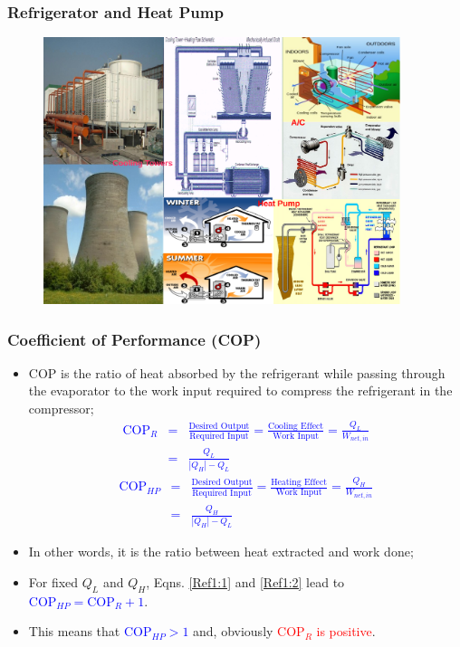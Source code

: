 \documentclass[10pt,compress,handout,ignorenonframetext]{beamer}
\newcommand{\frc}{\displaystyle\frac}
\begin{document}
\begin{frame}
 \frametitle{Refrigerator and Heat Pump}
    \begin{figure}%
     \begin{center}
      \includegraphics[width=12.cm,height=7.8cm]{./Pics/Overview_Refrig3}
     \end{center}
    \end{figure}
\end{frame}


\begin{frame}
 \frametitle{Coefficient of Performance (COP)}
 \begin{itemize}
  \item <1-> COP is the ratio of heat absorbed by the refrigerant while passing through the evaporator to the work input required to compress the refrigerant in the compressor;
   \textcolor{blue}{
   \begin{eqnarray}
    \text{COP}_{R} &=&\frc{\text{Desired Output}}{\text{Required Input}}=\frc{\text{Cooling Effect}}{\text{Work Input}}=\frc{Q_{L}}{W_{net,in}} \nonumber\\
                   &=& \frc{Q_{L}}{|Q_{H}|-Q_{L}}\label{Ref1:1}
   \end{eqnarray}
   \begin{eqnarray}
   \text{COP}_{HP}&=&\frc{\text{Desired Output}}{\text{Required Input}}=\frc{\text{Heating Effect}}{\text{Work Input}}=\frc{Q_{H}}{W_{net,in}} \nonumber \\
                 &=&\frc{Q_{H}}{|Q_{H}|-Q_{L}}    \label{Ref1:2}
   \end{eqnarray}}
  \item <2-> In other words, it is the ratio between heat extracted and work done;
  \item <3-> For fixed $Q_{L}$ and $Q_{H}$, Eqns. \ref{Ref1:1} and \ref{Ref1:2} lead to \textcolor{blue}{$\text{COP}_{HP}=\text{COP}_{R}+1$}.
  \item <4->This means that \textcolor{blue}{COP$_{HP}>1$} and, obviously \textcolor{red}{COP$_{R}$ is positive}.
 \end{itemize}
\end{frame}
\end{document}
